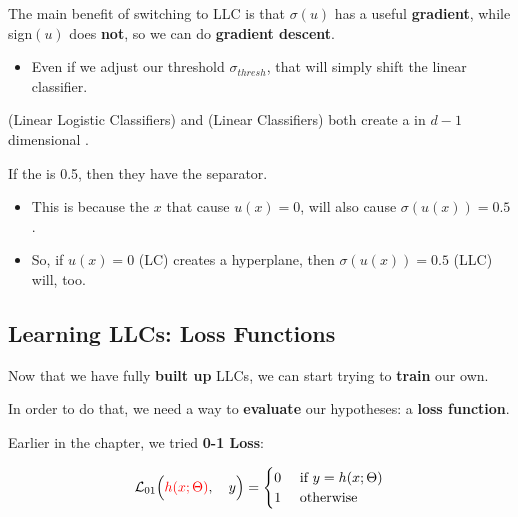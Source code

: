        The main benefit of switching to LLC is that $\sigma(u)$ has a useful \textbf{gradient}, while sign$(u)$ does \textbf{not}, so we can do \textbf{gradient descent}.

        \begin{itemize}
            \item Even if we adjust our threshold $\sigma_{thresh}$, that will simply shift the linear classifier.\\
        \end{itemize}
    
        
        \begin{concept}
             (Linear Logistic Classifiers) and  (Linear Classifiers) both create a   in $d-1$ dimensional .
            
            If the  is 0.5, then they have the  separator.

            \begin{itemize}
                \item This is because the  $x$ that cause $u(x)=0$, will also cause $\sigma(u(x))=0.5$.

                \item So, if $u(x)=0$ (LC) creates a hyperplane, then $\sigma(u(x))=0.5$ (LLC) will, too.
            \end{itemize}
        \end{concept}
    
    \subsection{Learning LLCs: Loss Functions}
    
        Now that we have fully \textbf{built up} LLCs, we can start trying to \textbf{train} our own. 
        
        In order to do that, we need a way to \textbf{evaluate} our hypotheses: a \textbf{loss function}.
        
        Earlier in the chapter, we tried \textbf{0-1 Loss}:

        \begin{equation*}
            \mathcal{L}_{01}
            \Big(  
                \textcolor{red}{h(x; \Theta)} ,\quad  y 
            \Big) 
            =
            \begin{cases}
                0 & \text{ if } y = h(x; \Theta)\\
                1 & \text{ otherwise}
            \end{cases}   
        \end{equation*}
        

